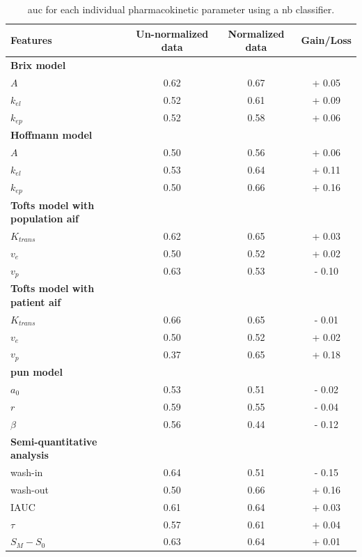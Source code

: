 \begin{table}
  \caption{\acs*{auc} for each individual pharmacokinetic parameter using a \acs*{nb} classifier.}
  \centering
  \begin{tabular}{l c c c}
    \toprule
    \textbf{Features} & Un-normalized data & Normalized data & Gain/Loss \\
    \midrule
    \textbf{Brix model} & & & \\
    \quad $A$         & 0.62 & 0.67 & + 0.05 \\
    \quad $k_{el}$    & 0.52 & 0.61 & + 0.09 \\
    \quad $k_{ep}$    & 0.52 & 0.58 & + 0.06 \\
    \textbf{Hoffmann model} & & & \\
    \quad $A$         & 0.50 & 0.56 & + 0.06 \\
    \quad $k_{el}$    & 0.53 & 0.64 & + 0.11 \\
    \quad $k_{ep}$    & 0.50 & 0.66 & + 0.16 \\
    \textbf{Tofts model with population \ac{aif}} & & & \\
    \quad $K_{trans}$ & 0.62 & 0.65 & + 0.03 \\
    \quad $v_{e}$     & 0.50 & 0.52 & + 0.02 \\
    \quad $v_{p}$     & 0.63 & 0.53 & - 0.10 \\
    \textbf{Tofts model with patient \ac{aif}} & & & \\
    \quad $K_{trans}$ & 0.66 & 0.65 & - 0.01 \\
    \quad $v_{e}$     & 0.50 & 0.52 & + 0.02 \\
    \quad $v_{p}$     & 0.37 & 0.65 & + 0.18 \\
    \textbf{\ac{pun} model} & & & \\
    \quad $a_0$       & 0.53 & 0.51 & - 0.02 \\
    \quad $r$         & 0.59 & 0.55 & - 0.04 \\
    \quad $\beta$     & 0.56 & 0.44 & - 0.12 \\
    \textbf{Semi-quantitative analysis} & & & \\
    \quad wash-in     & 0.64 & 0.51 & - 0.15 \\
    \quad wash-out    & 0.50 & 0.66 & + 0.16 \\
    \quad IAUC        & 0.61 & 0.64 & + 0.03 \\
    \quad $\tau$      & 0.57 & 0.61 & + 0.04 \\
    \quad $S_M - S_0$ & 0.63 & 0.64 & + 0.01 \\
    \bottomrule
  \end{tabular}
  \label{tab:resfeats}
\end{table}

